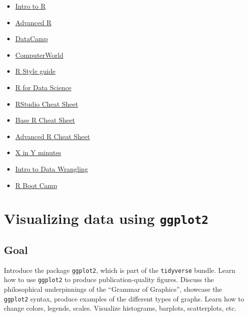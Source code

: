 \documentclass[
  letterpaper,
  DIV=11,
  numbers=noendperiod]{scrreprt}
\providecommand{\tightlist}{%
  \setlength{\itemsep}{0pt}\setlength{\parskip}{0pt}}\usepackage{longtable,booktabs,array}
\begin{document}
\begin{itemize}
\tightlist
\item
  \href{https://cran.r-project.org/doc/manuals/r-release/R-intro.html}{Intro
  to R}
\item
  \href{http://adv-r.had.co.nz/}{Advanced R}
\item
  \href{https://www.datacamp.com/courses/free-introduction-to-r}{DataCamp}
\item
  \href{https://www.computerworld.com/article/2497143/business-intelligence/business-intelligence-beginner-s-guide-to-r-introduction.html}{ComputerWorld}
\item
  \href{http://adv-r.had.co.nz/Style.html}{R Style guide}
\item
  \href{https://hackr.io/tutorial/r-for-data-science}{R for Data
  Science}
\item
  \href{https://github.com/rstudio/cheatsheets/raw/master/rstudio-ide.pdf}{RStudio
  Cheat Sheet}
\item
  \href{http://github.com/rstudio/cheatsheets/raw/master/base-r.pdf}{Base
  R Cheat Sheet}
\item
  \href{https://www.rstudio.com/wp-content/uploads/2016/02/advancedR.pdf}{Advanced
  R Cheat Sheet}
\item
  \href{https://learnxinyminutes.com/docs/r/}{X in Y minutes}
\item
  \href{https://cengel.github.io/R-data-wrangling/index.html}{Intro to
  Data Wrangling}
\item
  \href{https://r-bootcamp.netlify.app/}{R Boot Camp}
\end{itemize}


\hypertarget{visualizing-data-using-ggplot2}{%
\chapter{\texorpdfstring{Visualizing data using
\texttt{ggplot2}}{Visualizing data using ggplot2}}\label{visualizing-data-using-ggplot2}}

\hypertarget{goal-1}{%
\section{Goal}\label{goal-1}}

Introduce the package \texttt{ggplot2}, which is part of the
\texttt{tidyverse} bundle. Learn how to use \texttt{ggplot2} to produce
publication-quality figures. Discuss the philosophical underpinnings of
the ``Grammar of Graphics'', showcase the \texttt{ggplot2} syntax,
produce examples of the different types of graphs. Learn how to change
colors, legends, scales. Visualize histograms, barplots, scatterplots,
etc.
\end{document}
